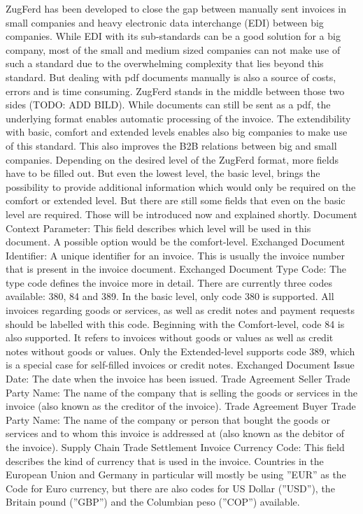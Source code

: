 ZugFerd has been developed to close the gap between manually sent invoices in small companies and heavy electronic data interchange (EDI) between big companies. While EDI with its sub-standards can be a good solution for a big company, most of the small and medium sized companies can not make use of such a standard due to the overwhelming complexity that lies beyond this standard. But dealing with pdf documents manually is also a source of costs, errors and is time consuming.
ZugFerd stands in the middle between those two sides (TODO: ADD BILD). While documents can still be sent as a pdf, the underlying format enables automatic processing of the invoice. The extendibility with basic, comfort and extended levels enables also big companies to make use of this standard. This also improves the B2B relations between big and small companies.
Depending on the desired level of the ZugFerd format, more fields have to be filled out. But even the lowest level, the basic level, brings the possibility to provide additional information which would only be required on the comfort or extended level. But there are still some fields that even on the basic level are required. Those will be introduced now and explained shortly.
Document Context Parameter: This field describes which level will be used in this document. A possible option would be the comfort-level.
Exchanged Document Identifier: A unique identifier for an invoice. This is usually the invoice number that is present in the invoice document.
Exchanged Document Type Code: The type code defines the invoice more in detail. There are currently three codes available: 380, 84 and 389.
In the basic level, only code 380 is supported. All invoices regarding goods or services, as well as credit notes and payment requests should be labelled with this code.
Beginning with the Comfort-level, code 84 is also supported. It refers to invoices without goods or values as well as credit notes without goods or values.
Only the Extended-level supports code 389, which is a special case for self-filled invoices or credit notes.
Exchanged Document Issue Date: The date when the invoice has been issued.
Trade Agreement Seller Trade Party Name: The name of the company that is selling the goods or services in the invoice (also known as the creditor of the invoice).
Trade Agreement Buyer Trade Party Name: The name of the company or person that bought the goods or services and to whom this invoice is addressed at (also known as the debitor of the invoice).
Supply Chain Trade Settlement Invoice Currency Code: This field describes the kind of currency that is used in the invoice. Countries in the European Union and Germany in particular will mostly be using ''EUR'' as the Code for Euro currency, but there are also codes for US Dollar (''USD''), the Britain pound (''GBP'') and the Columbian peso (''COP'') available.

